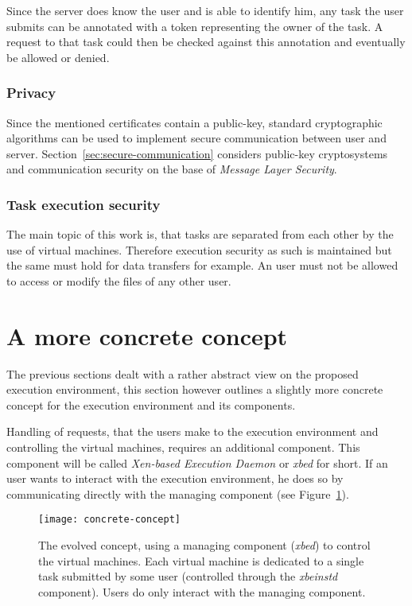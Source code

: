 Since the server does know the user  and is able to identify him, any task
the user submits  can be annotated with a token  representing the owner of
the  task.  A  request to  that task  could then  be checked  against this
annotation and eventually be allowed or denied.

\subsubsection{Privacy}

Since   the  mentioned   certificates  contain   a   public-key,  standard
cryptographic  algorithms can  be used  to implement  secure communication
between user and server.  Section~\ref{sec:secure-communication} considers
public-key  cryptosystems  and  communication  security  on  the  base  of
\emph{Message Layer Security}.

\subsubsection{Task execution security}

The main topic  of this work is, that tasks are  separated from each other
by the use  of virtual machines.  Therefore execution  security as such is
maintained but the same must hold  for data transfers for example. An user
must not be allowed to access or modify the files of any other user.

\section{A more concrete concept}

The previous  sections dealt with a  rather abstract view  on the proposed
execution  environment,  this section  however  outlines  a slightly  more
concrete  concept  for  the  execution  environment  and  its  components.

Handling of requests, that the users make to the execution environment and
controlling the  virtual machines, requires an  additional component. This
component will be called  \emph{Xen-based Execution Daemon} or \emph{xbed}
for short. If an user wants to interact with the execution environment, he
does  so  by  communicating  directly  with the  managing  component  (see
Figure~\ref{fig:concrete-concept}).

\begin{figure}[htbp]
  \centering
  \texttt{[image: concrete-concept]}
  \caption[A more concrete concept]{The  evolved concept, using a managing
    component (\emph{xbed}) to control the virtual machines.  Each virtual
    machine  is  dedicated  to  a  single  task  submitted  by  some  user
    (controlled  through the  \emph{xbeinstd} component).   Users  do only
    interact with the managing component.}
  \label{fig:concrete-concept}
\end{figure}

